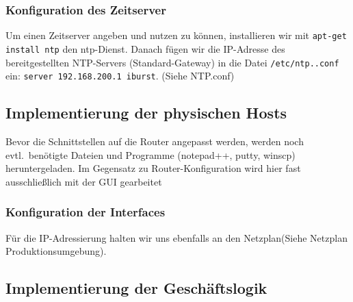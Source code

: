 \subsubsection{Konfiguration des Zeitserver}
\label{subsubsec:KonfigurationNTP}
Um einen Zeitserver angeben und nutzen zu können, installieren wir mit \verb+apt-get install ntp+ den ntp-Dienst. Danach fügen wir die IP-Adresse des bereitgestellten NTP-Servers (Standard-Gateway) in die Datei \verb+/etc/ntp..conf+ ein: \verb+server 192.168.200.1 iburst+. (Siehe NTP.conf)



\subsection{Implementierung der physischen Hosts}
\label{subsec:ImplementierungHosts}
Bevor die Schnittstellen auf die Router angepasst werden, werden noch evtl.\ benötigte Dateien und Programme (notepad++, putty, winscp) heruntergeladen. Im Gegensatz zu Router-Konfiguration wird hier fast ausschließlich mit der GUI gearbeitet

\subsubsection{Konfiguration der Interfaces}
\label{subsubsec:KonfigurationHostInt}
Für die IP-Adressierung halten wir uns ebenfalls an den Netzplan(Siehe Netzplan Produktionsumgebung).





\subsection{Implementierung der Geschäftslogik}
\label{sec:ImplementierungGeschaeftslogik}

